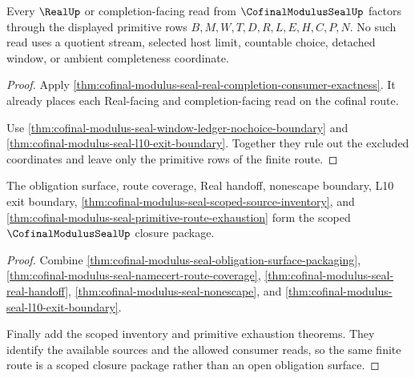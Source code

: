 \begin{theorem}
\label{thm:cofinal-modulus-seal-primitive-route-exhaustion}
Every $\RealUp$ or completion-facing read from $\CofinalModulusSealUp$ factors through the displayed primitive rows $B,M,W,T,D,R,L,E,H,C,P,N$. No such read uses a quotient stream, selected host limit, countable choice, detached window, or ambient completeness coordinate.
\end{theorem}
\begin{proof}
Apply \autoref{thm:cofinal-modulus-seal-real-completion-consumer-exactness}. It already places each Real-facing and completion-facing read on the cofinal route.

Use \autoref{thm:cofinal-modulus-seal-window-ledger-nochoice-boundary} and \autoref{thm:cofinal-modulus-seal-l10-exit-boundary}. Together they rule out the excluded coordinates and leave only the primitive rows of the finite route.
\end{proof}

\begin{theorem}
\label{thm:cofinal-modulus-seal-scoped-closure-package}
The obligation surface, route coverage, Real handoff, nonescape boundary, L10 exit boundary, \autoref{thm:cofinal-modulus-seal-scoped-source-inventory}, and \autoref{thm:cofinal-modulus-seal-primitive-route-exhaustion} form the scoped $\CofinalModulusSealUp$ closure package.
\end{theorem}
\begin{proof}
Combine \autoref{thm:cofinal-modulus-seal-obligation-surface-packaging}, \autoref{thm:cofinal-modulus-seal-namecert-route-coverage}, \autoref{thm:cofinal-modulus-seal-real-handoff}, \autoref{thm:cofinal-modulus-seal-nonescape}, and \autoref{thm:cofinal-modulus-seal-l10-exit-boundary}.

Finally add the scoped inventory and primitive exhaustion theorems. They identify the available sources and the allowed consumer reads, so the same finite route is a scoped closure package rather than an open obligation surface.
\end{proof}

